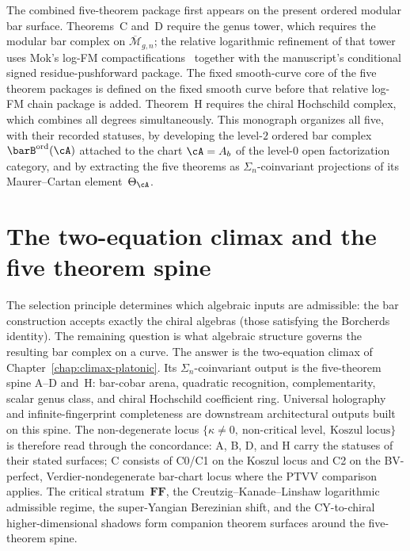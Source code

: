 \smallskip\noindent
The combined five-theorem package first appears on the present
ordered modular bar surface.
Theorems~C and~D require the genus tower, which requires
the modular bar complex on $\overline{\mathcal{M}}_{g,n}$; the
relative logarithmic refinement of that tower uses Mok's log-FM
compactifications~\cite{Mok25} together with the manuscript's
conditional signed residue-pushforward package. The fixed smooth-curve
core of the five theorem packages is defined on the fixed smooth curve
before that relative log-FM chain package is added. Theorem~H requires the chiral Hochschild complex,
which combines all degrees simultaneously.
This monograph organizes all five, with their recorded statuses, by
developing the level-$2$ ordered
bar complex $\barB^{\mathrm{ord}}(\cA)$ attached to the chart
$\cA=A_b$ of the level-$0$ open factorization category, and by
extracting the five theorems as $\Sigma_n$-coinvariant projections of
its Maurer--Cartan element~$\Theta_\cA$.


\section{The two-equation climax and the five theorem spine}
\label{sec:NAP-unifying}
\label{sec:main-results-complete}
\label{sec:seven-theorems}
\label{sec:climax-and-corollaries}

The selection principle determines which algebraic inputs are
admissible: the bar construction accepts exactly the chiral algebras
(those satisfying the Borcherds identity). The remaining question is
what algebraic structure governs the resulting bar complex on a curve.
The answer is the two-equation climax of
Chapter~\ref{chap:climax-platonic}. Its $\Sigma_n$-coinvariant output
is the five-theorem spine A--D and~H: bar-cobar arena, quadratic
recognition, complementarity, scalar genus class, and chiral Hochschild coefficient
ring. Universal holography and infinite-fingerprint completeness are
downstream architectural outputs built on this spine. The non-degenerate locus
$\{\kappa\ne 0,\ \text{non-critical level},\ \text{Koszul locus}\}$
is therefore read through the concordance: A, B, D, and H carry the
statuses of their stated surfaces; C consists of C0/C1 on the Koszul locus and
C2 on the BV-perfect, Verdier-nondegenerate bar-chart locus where the
PTVV comparison applies. The critical stratum~$\mathbf{FF}$, the
Creutzig--Kanade--Linshaw logarithmic admissible regime, the
super-Yangian Berezinian shift, and the CY-to-chiral
higher-dimensional shadows form companion theorem surfaces around the
five-theorem spine.

